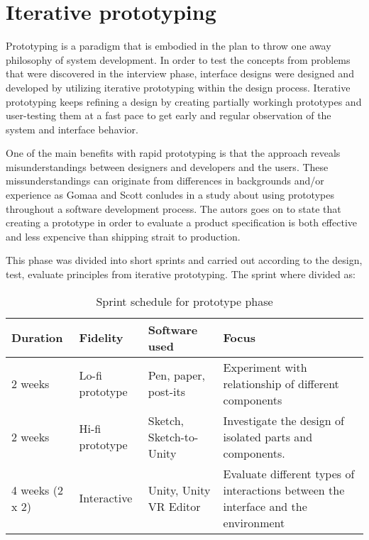 \section{Iterative prototyping}
Prototyping is a paradigm that is embodied in the plan to throw one
away philosophy of system development. \cite{proto:Gomaa1981}
In order to test the concepts from problems that were discovered in the interview phase, interface designs were designed and developed by utilizing iterative prototyping within the design process. Iterative prototyping keeps refining a design by creating partially workingh prototypes and user-testing them at a fast pace to get early and regular observation of the system and interface behavior.\cite{proto:hartson2012ux}

One of the main benefits with rapid prototyping is that the approach reveals misunderstandings between designers and developers and the  users. These missunderstandings can originate from differences in backgrounds and/or experience as Gomaa and Scott conludes in a study about using prototypes throughout a software development process.\cite{proto:Lichter1993} The autors goes on to state that creating a prototype in order to evaluate a product specification is both effective and less expencive than shipping strait to production.


This phase was divided into short sprints and carried out according to the design, test, evaluate principles from iterative prototyping.\cite{proto:hartson2012ux} The sprint where divided as:

\begin{table}[]
  \centering
  \caption{Sprint schedule for prototype phase}
  \label{table:sprints}
  \begin{tabular}{|l|l|l| p{5cm}|}
     \hline
    \textbf{Duration} & \textbf{Fidelity} & \textbf{Software used} & \textbf{Focus} \\\hline
    2 weeks                         & Lo-fi prototype  & Pen, paper, post-its    & Experiment with relationship of different components                               \\\hline
    2 weeks                        & Hi-fi prototype & Sketch, Sketch-to-Unity & Investigate the design of isolated parts and components.                           \\\hline
    4 weeks (2 x 2)                 & Interactive   & Unity, Unity VR Editor  & Evaluate different types of interactions between the interface and the environment  \\\hline
  \end{tabular}
\end{table}
